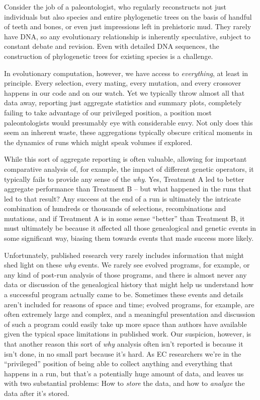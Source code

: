 Consider the job of a paleontologist, who regularly reconstructs not just individuals but also
species and entire phylogenetic trees on the basis of handful of teeth and bones, or even just
impressions left in prehistoric mud. They rarely have DNA, so any evolutionary relationship is
inherently speculative, subject to constant debate and revision. Even with detailed DNA sequences,
the construction of phylogenetic trees for existing species is a challenge.

In evolutionary computation, however, we have access to \emph{everything}, at least in principle. Every
selection, every mating, every mutation, and every crossover happens in our code and on our watch.
Yet we typically throw almost all that data away, reporting just aggregate statistics and summary
plots, completely failing to take advantage of our privileged position, a position most 
paleontologists would presumably eye with considerable envy. Not only does this seem an inherent
waste, these aggregations typically obscure critical moments in the dynamics of runs which might
speak volumes if explored.

While this sort of aggregate reporting is often valuable, allowing for important comparative
analysis of, for example, the impact of different genetic operators, it typically fails to provide
any sense of the \emph{why}. Yes, Treatment A led to better aggregate performance than 
Treatment B -- but what happened in the runs that led to that result? Any success at the end of a
run is ultimately the intricate combination of hundreds or thousands of selections, recombinations
and mutations, and if Treatment A is in some sense ``better'' than Treatment B, it must ultimately
be because it affected all those genealogical and genetic events in some significant way, biasing them
towards events that made success more likely.

Unfortunately, published research very rarely includes information that might shed light on 
these \emph{why} events. We rarely see evolved programs, for example, or any kind of post-run analysis
of those programs, and there is almost never any data or discussion of the genealogical history that
might help us understand how a successful program actually came to be. 
Sometimes these events and details aren't included
for reasons of space and time; evolved programs, for example, are often extremely large and complex,
and a meaningful presentation and discussion of such a program could easily take up more space than
authors have available given the typical space limitations in published work.
Our suspicion, however, is that another reason this sort of \emph{why} analysis often isn't 
reported is because it isn't done, in no small part because it's hard. As EC researchers we're in the
``privileged'' position of being able to collect anything and everything that happens in a run, 
but that's a potentially huge amount of data, and leaves us with two substantial problems: 
How to \emph{store} the data, and how to \emph{analyze} the data
after it's stored. 

